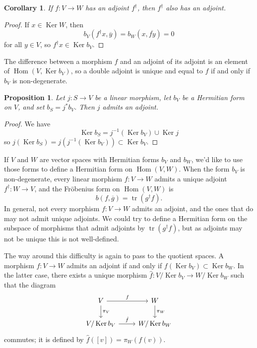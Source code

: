 \documentclass[10pt,a4paper]{article}
\newtheorem{prop}[theo]{Proposition}
\newtheorem{coro}[theo]{Corollary}
\newtheorem*{proof}{Proof}
\def\ov#1{\overline{#1}}
\DeclareMathOperator{\Ker}{Ker}
\DeclareMathOperator{\Hom}{Hom}
\DeclareMathOperator{\tr}{tr}
\begin{document}
\begin{coro}
If $f : V \to W$ has an adjoint $f^\dagger$, then $f^\dagger$ also has an adjoint.
\end{coro}

\begin{proof}
If $x \in \Ker W$, then
\[
b_V(f^\dagger x, \ov y)
= b_W(x, \ov{fy})
= 0
\]
for all $y \in V$, so $f^\dagger x \in \Ker b_V$.
\end{proof}

The difference between a morphism $f$ and an adjoint of its adjoint is an element of $\Hom(V, \Ker b_V)$, so a double adjoint is unique and equal to $f$ if and only if $b_V$ is non-degenerate.


\begin{prop}
Let $j : S \to V$ be a linear morphism, let $b_V$ be a Hermitian form on $V$, and set $b_S = j^*b_V$. Then $j$ admits an adjoint.
\end{prop}

\begin{proof}
We have
\[
\Ker b_S = j^{-1}(\Ker b_V) \cup \Ker j
\]
so $j(\Ker b_S) = j(j^{-1}(\Ker b_V)) \subset \Ker b_V$.
\end{proof}



If $V$ and $W$ are vector spaces with Hermitian forms $b_V$ and $b_W$, we'd like to use those forms to define a Hermitian form on $\Hom(V,W)$. When the form $b_V$ is non-degenerate, every linear morphism $f : V \to W$ admits a unique adjoint $f^\dagger : W \to V$, and the Fr\"obenius form on $\Hom(V,W)$ is
\[
b(f, \ov g) = \tr(g^\dagger f).
\]
In general, not every morphism $f : V \to W$ admits an adjoint, and the ones that do may not admit unique adjoints. We could try to define a Hermitian form on the subspace of morphisms that admit adjoints by $\tr(g^\dagger f)$, but as adjoints may not be unique this is not well-defined.

The way around this difficulty is again to pass to the quotient spaces. A morphism $f : V \to W$ admits an adjoint if and only if $f(\Ker b_V) \subset \Ker b_W$. In the latter case, there exists a unique morphism $\hat f : V / \Ker b_V \to W / \Ker b_W$ such that the diagram
\[
\begin{tikzcd}
V \ar[d,"\pi_V"] \ar[r,"f"] & W \ar[d,"\pi_W"]
\\
V / \Ker b_V \ar[r,"\hat f"] & W / \Ker b_W
\end{tikzcd}
\]
commutes; it is defined by $\hat f([v]) = \pi_W(f(v))$.
\end{document}
